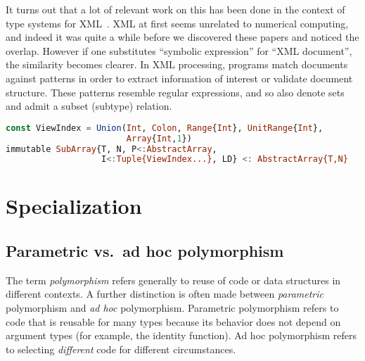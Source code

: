 It turns out that a lot of relevant work on this has been done in the
context of type systems for XML~\cite{hosoya2000xduce, BCF03}.
XML at first seems unrelated to numerical computing, and indeed it
was quite a while before we discovered these papers and noticed the
overlap.
However if one substitutes ``symbolic expression'' for ``XML document'',
the similarity becomes clearer.
In XML processing, programs match documents against patterns in order
to extract information of interest or validate document structure.
These patterns resemble regular expressions, and so also denote sets
and admit a subset (subtype) relation.


\begin{singlespace}
\begin{lstlisting}[language=julia]
const ViewIndex = Union(Int, Colon, Range{Int}, UnitRange{Int},
                        Array{Int,1})
immutable SubArray{T, N, P<:AbstractArray,
                   I<:Tuple{ViewIndex...}, LD} <: AbstractArray{T,N}
\end{lstlisting}
\end{singlespace}




\section{Specialization}

\subsection{Parametric vs.\ ad hoc polymorphism}

The term \emph{polymorphism} refers generally to reuse of code or data
structures in different contexts.
A further distinction is often made between \emph{parametric} polymorphism
and \emph{ad hoc} polymorphism.
Parametric polymorphism refers to code that is reusable for many types
because its behavior does not depend on argument types (for example,
the identity function).
Ad hoc polymorphism refers to selecting
\emph{different} code for different circumstances.


